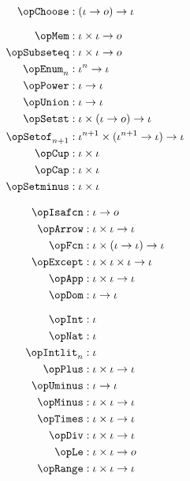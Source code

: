 \documentclass[11pt, a4paper, oneside]{article}
\begin{document}
\begin{minipage}[t]{.5\textwidth}
    \begin{align*}
        \opChoose       &: (\idv \arr o) \arr \idv \\[7pt]
        \opMem          &: \idv \times \idv \arr o \\
        \opSubseteq     &: \idv \times \idv \arr o \\
        \opEnum_n       &: \idv^n \arr \idv \\
        \opPower        &: \idv \arr \idv \\
        \opUnion        &: \idv \arr \idv \\
        \opSetst        &: \idv \times (\idv \arr o) \arr \idv \\
        \opSetof_{n+1}  &: \idv^{n+1} \times (\idv^{n+1} \arr \idv) \arr \idv \\
        \opCup          &: \idv \times \idv \\
        \opCap          &: \idv \times \idv \\
        \opSetminus     &: \idv \times \idv
    \end{align*}
\end{minipage}%
\begin{minipage}[t]{.5\textwidth}
    \begin{align*}
        \opIsafcn       &: \idv \arr o \\
        \opArrow        &: \idv \times \idv \arr \idv \\
        \opFcn          &: \idv \times (\idv \arr \idv) \arr \idv \\
        \opExcept       &: \idv \times \idv \times \idv \arr \idv \\
        \opApp          &: \idv \times \idv \arr \idv \\
        \opDom          &: \idv \arr \idv \\[7pt]
        \opInt          &: \idv \\
        \opNat          &: \idv \\
        \opIntlit_n     &: \idv \\
        \opPlus         &: \idv \times \idv \arr \idv \\
        \opUminus       &: \idv \arr \idv \\
        \opMinus        &: \idv \times \idv \arr \idv \\
        \opTimes        &: \idv \times \idv \arr \idv \\
        \opDiv          &: \idv \times \idv \arr \idv \\
        \opLe           &: \idv \times \idv \arr o \\
        \opRange        &: \idv \times \idv \arr \idv
    \end{align*}
\end{minipage}
\end{document}

